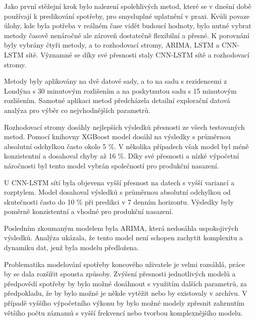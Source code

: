\documentclass[FM,BP,fonts]{tulthesis}
\begin{document}
Jako první stěžejní krok bylo nalezení spolehlivých metod, které se v dnešní době používají k predikování spotřeby, pro smysluplné uplatnění v praxi. Kvůli povaze úlohy, kde byla potřeba v reálném čase vidět budoucí hodnoty, bylo nutné vybrat metody časově nenáročné ale zároveň dostatečně flexibilní a přesné. K porovnání byly vybrány čtyři metody, a to rozhodovací stromy, ARIMA, LSTM a CNN-LSTM sítě. Významné se díky své přesnosti staly CNN-LSTM sítě a rozhodovací stromy.

Metody byly aplikovány na dvě datové sady, a to na sadu s rezidencemi z Londýna s 30 minutovým rozlišením a na poskytnutou sadu s 15 minutovým rozlišením. Samotné aplikaci metod předcházela detailní explorační datová analýza pro výběr co nejvhodnějších parametrů.

Rozhodovací stromy dosáhly nejlepších výsledků přesnosti ze všech testovaných metod. Pomocí knihovny XGBoost model dosáhl na výsledky s průměrnou absolutní odchylkou často okolo 5 \%. V několika případech však model byl méně konzistentní a dosahoval chyby až 16 \%. Díky své přesnosti a nízké výpočetní náročnosti byl tento model vybrán společností pro produkční nasazení.

U CNN-LSTM sítí byla objevena vyšší přesnost na datech s vyšší variancí a rozptylem. Model dosahoval výsledků s průměrnou absolutní odchylkou od skutečnosti často do 10 \% při predikci v 7 denním horizontu. Výsledky byly poměrně konzistentní a vhodné pro produkční nasazení.


Posledním zkoumaným modelem byla ARIMA, která nedosáhla uspokojivých výsledků. Analýza ukázala, že tento model není schopen zachytit komplexitu a dynamiku dat, jenž byla modelu předložena.

Problematika modelování spotřeby koncového uživatele je velmi rozsáhlá, práce by se dala rozšířit spousta způsoby. Zvýšení přesnosti jednotlivých modelů a předpovědí spotřeby by bylo možné dosáhnout s využitím dalších parametrů, za předpokladu, že by bylo možné je někde vytěžit nebo by existovaly v archívu. V případě vyššího výpočetního výkonu by bylo možné modely zpřesnit zahrnutím většího počtu záznamů s vyšší frekvencí nebo tvorbou komplexnějšího modelu.


\printbibliography[title={Použitá literatura}] %

\end{document}
